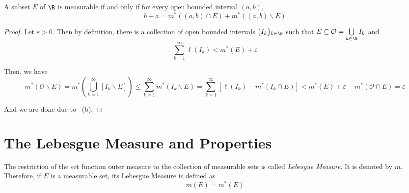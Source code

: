 \begin{theorem}[Lebesgue]
    A subset $E$ of $\R$ is measurable if and only if for every open bounded interval $(a,b)$, 
    \begin{equation*}
        b - a = m^*((a,b)\cap E) + m^*((a,b)\backslash E)
    \end{equation*}
\end{theorem}
\begin{proof}
    Let $\varepsilon > 0$. Then by definition, there is a collection of open bounded intervals $\{I_k\}_{k\in\N}$ such that $E\subseteq\mathcal O = \bigcup\limits_{k\in\N} I_k$ and 
    \begin{equation*}
        \sum_{k = 1}^\infty\ell(I_k) < m^*(E) + \varepsilon
    \end{equation*}

    Then, we have
    \begin{equation*}
        m^*(\mathcal O\backslash E) = m^*\left(\bigcup_{k = 1}^\infty[I_k\backslash E]\right)\le\sum_{k = 1}^{\infty}m^*(I_k\backslash E) = \sum_{k = 1}^\infty\left[\ell(I_k) - m^*(I_k\cap E)\right] < m^*(E) + \varepsilon - m^*(\mathcal O\cap E) = \varepsilon
    \end{equation*}

    And we are done due to ~(b).
\end{proof}

\section{The Lebesgue Measure and Properties}

\begin{definition}
    The restriction of the set function outer measure to the collection of measurable sets is called \textit{Lebesgue Measure}. It is denoted by $m$. Therefore, if $E$ is a measurable set, its Lebesgue Measure is defined as 
    \begin{equation*}
        m(E) = m^*(E)
    \end{equation*}
\end{definition}

